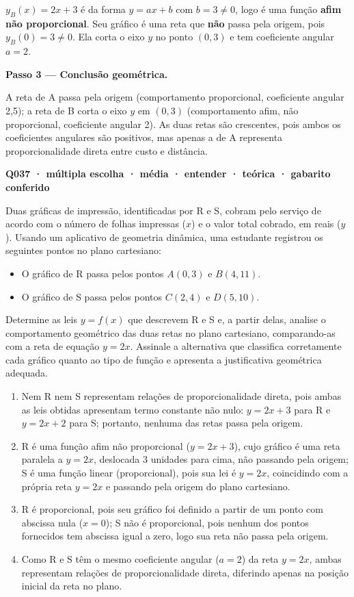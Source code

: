 \documentclass[11pt,a4paper]{article}
\begin{document}
$y_B(x) = 2x+3$ é da forma $y = ax+b$ com $b = 3 \neq 0$, logo é uma função \textbf{afim não proporcional}. Seu gráfico é uma reta que \textbf{não} passa pela origem, pois $y_B(0) = 3 \neq 0$. Ela corta o eixo $y$ no ponto $(0,3)$ e tem coeficiente angular $a = 2$.

\textbf{Passo 3 — Conclusão geométrica.}

A reta de A passa pela origem (comportamento proporcional, coeficiente angular 2,5); a reta de B corta o eixo $y$ em $(0,3)$ (comportamento afim, não proporcional, coeficiente angular 2). As duas retas são crescentes, pois ambos os coeficientes angulares são positivos, mas apenas a de A representa proporcionalidade direta entre custo e distância.

\bigskip\noindent\textbf{Q037 · múltipla escolha · média · entender · teórica · gabarito conferido}\par\nopagebreak
Duas gráficas de impressão, identificadas por R e S, cobram pelo serviço de acordo com o número de folhas impressas ($x$) e o valor total cobrado, em reais ($y$). Usando um aplicativo de geometria dinâmica, uma estudante registrou os seguintes pontos no plano cartesiano:

\begin{itemize}[nosep,leftmargin=*]
\item O gráfico de R passa pelos pontos $A(0,3)$ e $B(4,11)$.
\item O gráfico de S passa pelos pontos $C(2,4)$ e $D(5,10)$.
\end{itemize}

Determine as leis $y = f(x)$ que descrevem R e S e, a partir delas, analise o comportamento geométrico das duas retas no plano cartesiano, comparando-as com a reta de equação $y = 2x$. Assinale a alternativa que classifica corretamente cada gráfico quanto ao tipo de função e apresenta a justificativa geométrica adequada.
\begin{enumerate}[label=(\alph*)]
\item Nem R nem S representam relações de proporcionalidade direta, pois ambas as leis obtidas apresentam termo constante não nulo: $y=2x+3$ para R e $y=2x+2$ para S; portanto, nenhuma das retas passa pela origem.
\item R é uma função afim não proporcional ($y=2x+3$), cujo gráfico é uma reta paralela a $y=2x$, deslocada 3 unidades para cima, não passando pela origem; S é uma função linear (proporcional), pois sua lei é $y=2x$, coincidindo com a própria reta $y=2x$ e passando pela origem do plano cartesiano.
\item R é proporcional, pois seu gráfico foi definido a partir de um ponto com abscissa nula ($x=0$); S não é proporcional, pois nenhum dos pontos fornecidos tem abscissa igual a zero, logo sua reta não passa pela origem.
\item Como R e S têm o mesmo coeficiente angular ($a=2$) da reta $y=2x$, ambas representam relações de proporcionalidade direta, diferindo apenas na posição inicial da reta no plano.
\end{enumerate}
\end{document}
